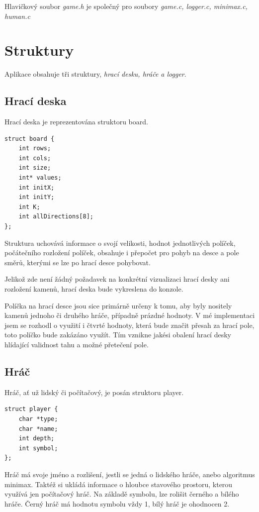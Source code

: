 \documentclass[
12pt,
a4paper,
pdftex,
czech,
titlepage
]{report}
\begin{document}
Hlavičkový soubor \textit{game.h} je společný pro soubory \textit{game.c, logger.c, minimax.c, human.c}

\section{Struktury}
Aplikace obsahuje tři struktury, \textit{hrací desku, hráče a logger}.
\subsection{Hrací deska}

Hrací deska je reprezentována struktoru board.
\begin{verbatim}
struct board {
    int rows;
    int cols;
    int size;
    int* values;
    int initX;
    int initY; 
    int K;
    int allDirections[8];
};
\end{verbatim}

Struktura uchovává informace o svojí velikosti, hodnot jednotlivých políček, počátečního rozložení políček, obsahuje i přepočet pro pohyb na desce a pole směrů, kterými se lze po hrací desce pohybovat.

Jelikož zde není žádný požadavek na konkrétní vizualizaci hrací desky ani rozložení kamenů, hrací deska bude vykreslena do konzole.  

Políčka na hrací desce jsou sice primárně určeny k tomu, aby byly nositely kamenů jednoho či druhého hráče, případně prázdné hodnoty. V mé implementaci jsem se rozhodl o využití i čtvrté hodnoty, která bude značit přesah za hrací pole, toto políčko bude zakázáno využít. Tím vznikne jakési obalení hrací desky hlídající validnost tahu a možné přetečení pole.

\subsection{Hráč}
Hráč, ať už lidský či počítačový, je posán struktoru player.

\begin{verbatim}
struct player {
    char *type; 
    char *name;
    int depth; 
    int symbol;
};
\end{verbatim}

Hráč má svoje jméno a rozlišení, jestli se jedná o lidského hráče, anebo algoritmus minimax. Taktéž si ukládá informace o hloubce stavového prostoru, kterou využívá jen počítačový hráč.
Na základě symbolu, lze rolišit černého a bílého hráče. Černý hráč má hodnotu symbolu vždy 1, bílý hráč je ohodnocen 2.
\end{document}
